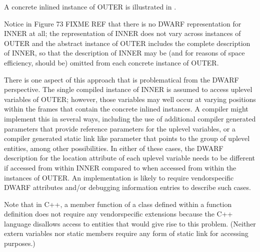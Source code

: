 A concrete inlined instance of OUTER is illustrated in
.

Notice in 
Figure 73 FIXME REF
that there is no DWARF representation for
INNER at all; the representation of INNER does not vary across
instances of OUTER and the abstract instance of OUTER includes
the complete description of INNER, so that the description of
INNER may be (and for reasons of space efficiency, should be)
omitted from each concrete instance of OUTER.

There is one aspect of this approach that is problematical from
the DWARF perspective. The single compiled instance of INNER
is assumed to access up\dash level variables of OUTER; however,
those variables may well occur at varying positions within
the frames that contain the concrete inlined instances. A
compiler might implement this in several ways, including the
use of additional compiler generated parameters that provide
reference parameters for the up\dash level variables, or a compiler
generated static link like parameter that points to the group
of up\dash level entities, among other possibilities. In either of
these cases, the DWARF description for the location attribute
of each uplevel variable needs to be different if accessed
from within INNER compared to when accessed from within the
instances of OUTER. An implementation is likely to require
vendor\dash specific DWARF attributes and/or debugging information
entries to describe such cases.

Note that in C++, a member function of a class defined within
a function definition does not require any vendor\dash specific
extensions because the C++ language disallows access to
entities that would give rise to this problem. (Neither extern
variables nor static members require any form of static link
for accessing purposes.)

